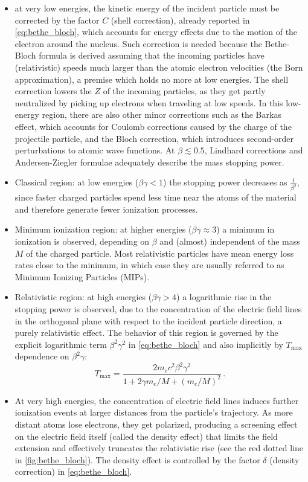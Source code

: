 \begin{itemize}
	\item at very low energies, the kinetic energy of the incident particle must be corrected by the factor $C$ (shell correction), already reported in \autoref{eq:bethe_bloch}, which accounts for energy effects due to the motion of the electron around the nucleus. Such correction is needed because the Bethe-Bloch formula is derived assuming that the incoming particles have (relativistic) speeds much larger than the atomic electron velocities (the Born approximation), a premise which holds no more at low energies. The shell correction lowers the $Z$ of the incoming particles, as they get partly neutralized by picking up electrons when traveling at low speeds. In this low-energy region, there are also other minor corrections such as the Barkas effect, which accounts for Coulomb corrections caused by the charge of the projectile particle, and the Bloch correction, which introduces second-order perturbations to atomic wave functions. At $\beta\lesssim0.5$, Lindhard corrections and Andersen-Ziegler formulae adequately describe the mass stopping power.
	\item Classical region: at low energies ($\beta\gamma<1$) the stopping power decreases as $\frac{1}{\beta^2}$, since faster charged particles spend less time near the atoms of the material and therefore generate fewer ionization processes.
	\item Minimum ionization region: at higher energies ($\beta\gamma\approx3$) a minimum in ionization is observed, depending on $\beta$ and (almost) independent of the mass $M$ of the charged particle. Most relativistic particles have mean energy loss rates close to the minimum, in which case they are usually referred to as Minimum Ionizing Particles (MIPs).
	\item Relativistic region: at high energies ($\beta\gamma>4$) a logarithmic rise in the stopping power is observed, due to the concentration of the electric field lines in the orthogonal plane with respect to the incident particle direction, a purely relativistic effect. The behavior of this region is governed by the explicit logarithmic term $\beta^2\gamma^2$ in \autoref{eq:bethe_bloch} and also implicitly by $T_\text{max}$ dependence on $\beta^2\gamma$:
	\begin{equation}
		T_\text{max}=\frac{2m_ec^2\beta^2\gamma^2}{1+2\gamma m_e/M+(m_e/M)^2}\,.
		\label{eq:t_max}
	\end{equation}
	\item At very high energies, the concentration of electric field lines induces further ionization events at larger distances from the particle's trajectory. As more distant atoms lose electrons, they get polarized, producing a screening effect on the electric field itself (called the density effect) that limits the field extension and effectively truncates the relativistic rise (see the red dotted line in \autoref{fig:bethe_bloch}). The density effect is controlled by the factor $\delta$ (density correction) in \autoref{eq:bethe_bloch}.
\end{itemize}
